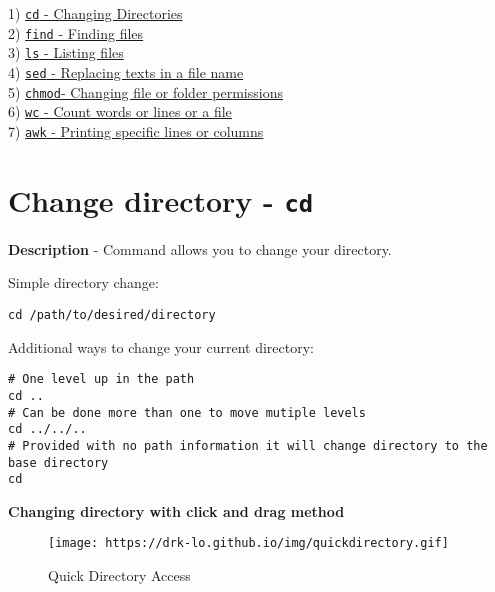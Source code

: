 \documentclass[
  letterpaper,
  DIV=11,
  numbers=noendperiod]{scrreprt}
\begin{document}
1)
\href{https://drk-lo.github.io/lotterhoslabprotocols/code_unixcommands/\#cd}{\texttt{cd}
- Changing Directories}\\
2)
\href{https://drk-lo.github.io/lotterhoslabprotocols/code_unixcommands/\#find}{\texttt{find}
- Finding files}\\
3)
\href{https://drk-lo.github.io/lotterhoslabprotocols/code_unixcommands/\#ls}{\texttt{ls}
- Listing files}\\
4)
\href{https://drk-lo.github.io/lotterhoslabprotocols/code_unixcommands/\#sed}{\texttt{sed}
- Replacing texts in a file name}\\
5)
\href{https://drk-lo.github.io/lotterhoslabprotocols/code_unixcommands/\#chmod}{\texttt{chmod}-
Changing file or folder permissions}\\
6)
\href{https://drk-lo.github.io/lotterhoslabprotocols/code_unixcommands/\#wc}{\texttt{wc}
- Count words or lines or a file}\\
7)
\href{https://drk-lo.github.io/lotterhoslabprotocols/code_unixcommands/\#awk}{\texttt{awk}
- Printing specific lines or columns}

\hypertarget{change-directory---cd}{%
\section*{\texorpdfstring{\textbf{Change directory -
\texttt{cd}}}{Change directory - cd}}\label{change-directory---cd}}

\textbf{Description} - Command allows you to change your directory.

Simple directory change:

\begin{verbatim}
cd /path/to/desired/directory
\end{verbatim}

Additional ways to change your current directory:

\begin{verbatim}
# One level up in the path
cd ..
# Can be done more than one to move mutiple levels
cd ../../..
# Provided with no path information it will change directory to the base directory
cd
\end{verbatim}

\textbf{Changing directory with click and drag method}

\begin{figure}

{\centering \texttt{[image: https://drk-lo.github.io/img/quickdirectory.gif]}

}

\caption{Quick Directory Access}

\end{figure}
\end{document}
